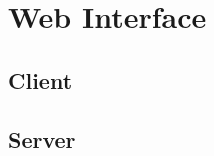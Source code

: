\section{Web Interface}
\label{app:web}

\subsection{Client}
\label{app:web_client}

\subsection{Server}
\label{app:web_client}

